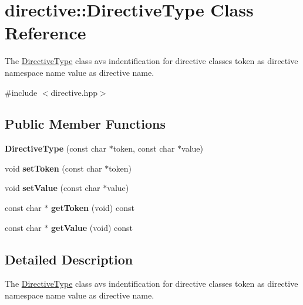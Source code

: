\hypertarget{classdirective_1_1DirectiveType}{}\section{directive\+:\+:Directive\+Type Class Reference}
\label{classdirective_1_1DirectiveType}


The \hyperlink{classdirective_1_1DirectiveType}{Directive\+Type} class avs indentification for directive classes token as directive namespace name value as directive name.  




{\ttfamily \#include $<$directive.\+hpp$>$}

\subsection*{Public Member Functions}
\begin{DoxyCompactItemize}
\item 
\mbox{\label{classdirective_1_1DirectiveType_a6e65828f5499b432da046e822205dcb8}} 
{\bfseries Directive\+Type} (const char $\ast$token, const char $\ast$value)
\item 
\mbox{\label{classdirective_1_1DirectiveType_aa3ca6d4a51dc200a73095d8803d657b9}} 
void {\bfseries set\+Token} (const char $\ast$token)
\item 
\mbox{\label{classdirective_1_1DirectiveType_a8f6365e40242de58cee466c3f88e59cd}} 
void {\bfseries set\+Value} (const char $\ast$value)
\item 
\mbox{\label{classdirective_1_1DirectiveType_a84ee9fa19422eb838d1976f5e2905a77}} 
const char $\ast$ {\bfseries get\+Token} (void) const
\item 
\mbox{\label{classdirective_1_1DirectiveType_a806593e687f3cc083c6e10ba21c790f7}} 
const char $\ast$ {\bfseries get\+Value} (void) const
\end{DoxyCompactItemize}


\subsection{Detailed Description}
The \hyperlink{classdirective_1_1DirectiveType}{Directive\+Type} class avs indentification for directive classes token as directive namespace name value as directive name. 

